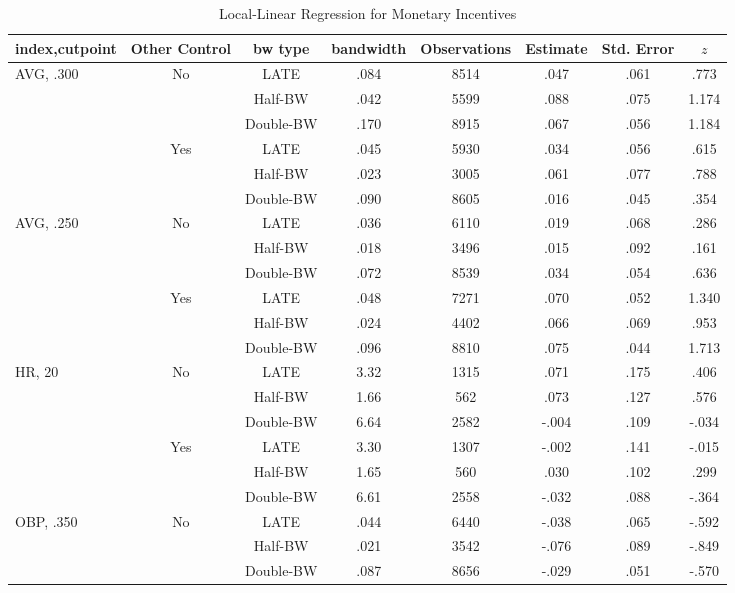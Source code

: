 \documentclass[dvipdfmx,12pt]{beamer}
\begin{document}
\begin{frame}\frametitle{}
  \begin{table}[!]
    \caption{Local-Linear Regression for Monetary Incentives}
    \label{RDD_A}
    \tiny
    \centering
    \begin{tabular}{lccccccc}\hline
      index,cutpoint & Other Control & bw type & bandwidth
      & Observations & Estimate & Std. Error & $z$
      \\ \hline \hline
      AVG, .300 & No &LATE & .084 & 8514 & .047 & .061 & .773 \\
      & &Half-BW &  .042 & 5599 & .088 & .075 & 1.174 \\
      & & Double-BW & .170 & 8915  & .067 & .056 & 1.184 \\ \cline{3-8}

      & Yes &LATE & .045 & 5930 & .034 & .056 & .615 \\
      & &Half-BW &  .023 & 3005 & .061 & .077 & .788 \\
      & & Double-BW & .090 & 8605  & .016 & .045 & .354 \\ \hline

      AVG, .250 & No &LATE & .036 & 6110 & .019 & .068 & .286 \\
      & &Half-BW &  .018 & 3496 & .015 & .092 & .161 \\
      & & Double-BW & .072 & 8539  & .034 & .054 & .636 \\ \cline{3-8}

      & Yes &LATE & .048 & 7271 & .070 & .052 & 1.340 \\
      & &Half-BW &  .024 & 4402 & .066 & .069 & .953 \\
      & & Double-BW & .096 & 8810  & .075 & .044 & 1.713 \\ \hline

      HR, 20 & No & LATE & 3.32 & 1315 & .071 & .175 & .406 \\
      & & Half-BW & 1.66 & 562 & .073 & .127 & .576 \\
      & & Double-BW & 6.64 & 2582 & -.004 & .109 & -.034 \\ \cline{3-8}

      & Yes & LATE & 3.30 & 1307 & -.002 & .141 & -.015\\
      & & Half-BW &1.65 & 560 & .030 & .102 & .299 \\
      & & Double-BW & 6.61 & 2558 & -.032 & .088 & -.364 \\ \hline

      OBP, .350 & No &LATE & .044 & 6440 & -.038 & .065 & -.592 \\
      & & Half-BW & .021 & 3542 & -.076 & .089 & -.849 \\
      & & Double-BW & .087 & 8656 & -.029 & .051 & -.570 \\ \cline{3-8}


\end{tabular}
\end{table}
\end{frame}
\end{document}
